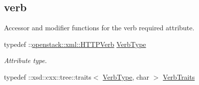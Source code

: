 \subsection*{verb}
\label{_amgrpb512ddf18cfec441e29917122387980f}
Accessor and modifier functions for the verb required attribute. \begin{DoxyCompactItemize}
\item 
\hypertarget{classopenstack_1_1xml_1_1RateLimit_aa08d40842c95ca8853259d991924365e}{
typedef ::\hyperlink{classopenstack_1_1xml_1_1HTTPVerb}{openstack::xml::HTTPVerb} \hyperlink{classopenstack_1_1xml_1_1RateLimit_aa08d40842c95ca8853259d991924365e}{VerbType}}
\label{classopenstack_1_1xml_1_1RateLimit_aa08d40842c95ca8853259d991924365e}

\begin{DoxyCompactList}\small\item\em Attribute type. \item\end{DoxyCompactList}\item 
\hypertarget{classopenstack_1_1xml_1_1RateLimit_a3dcb11fd6955c31d3b81dfe1d94030be}{
typedef ::xsd::cxx::tree::traits$<$ \hyperlink{classopenstack_1_1xml_1_1HTTPVerb}{VerbType}, char $>$ \hyperlink{classopenstack_1_1xml_1_1RateLimit_a3dcb11fd6955c31d3b81dfe1d94030be}{VerbTraits}}
\label{classopenstack_1_1xml_1_1RateLimit_a3dcb11fd6955c31d3b81dfe1d94030be}


\end{DoxyCompactItemize}
